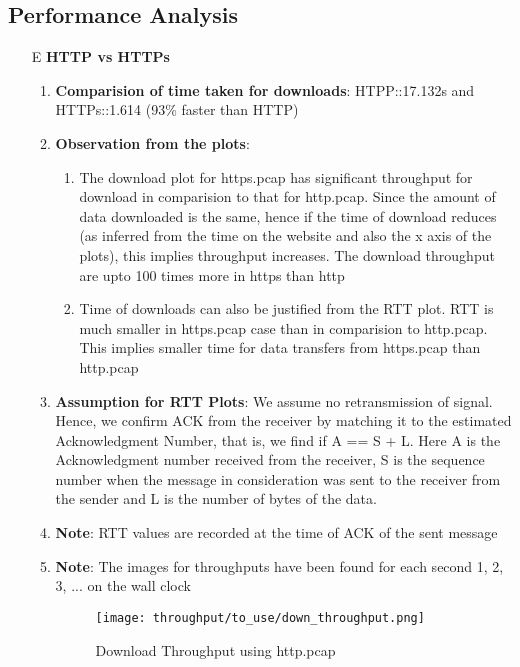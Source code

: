 \documentclass[12pt]{article}
\begin{document}
\subsection{Performance Analysis}
\begin{enumerate}
    \item[E] \textbf{HTTP vs HTTPs}
    \begin{enumerate}
        \item \textbf{Comparision of time taken for downloads}: HTPP::17.132s and HTTPs::1.614 (93\% faster than HTTP)
        \item \textbf{Observation from the plots}: 
        \begin{enumerate}
            \item The download plot for https.pcap has significant throughput for download in comparision to that for http.pcap. Since the amount of data downloaded is the same, hence if the time of download reduces (as inferred from the time on the website and also the x axis of the plots), this implies throughput increases. The download throughput are upto 100 times more in https than http
            \item Time of downloads can also be justified from the RTT plot. RTT is much smaller in https.pcap case than in comparision to http.pcap. This implies smaller time for data transfers from https.pcap than http.pcap
        \end{enumerate}
         \item \textbf{Assumption for RTT Plots}: We assume no retransmission of signal. Hence, we confirm ACK from the receiver by matching it to the estimated Acknowledgment Number, that is, we find if A == S + L. Here A is the Acknowledgment number received from the receiver, S is the sequence number when the message in consideration was sent to the receiver from the sender and L is the number of bytes of the data.
         \item \textbf{Note}: RTT values are recorded at the time of ACK of the sent message
         \item \textbf{Note}: The images for throughputs have been found for each second {1, 2, 3, ...} on the wall clock
        \begin{figure}[h!]
            \centering
            \texttt{[image: throughput/to\_use/down\_throughput.png]}
            \caption{Download Throughput using http.pcap}
        \end{figure}
        \begin{figure}[h!]
            \centering

\end{figure}
\end{enumerate}
\end{enumerate}
\end{document}
